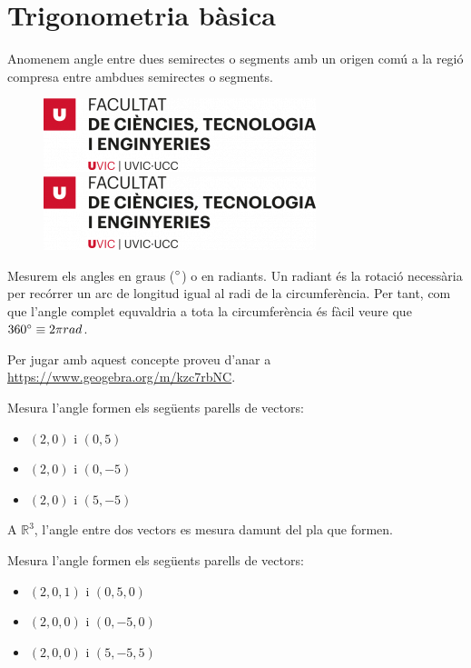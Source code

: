 \documentclass{beamer}
\begin{document}
\section{Trigonometria bàsica}
\begin{frame}
\begin{definicio}
  Anomenem angle entre dues semirectes o segments amb un origen comú a la regió compresa entre ambdues semirectes o segments.
\end{definicio}
  \begin{figure}
    \includegraphics[width=0.3\linewidth]{FCTE}
    \includegraphics[width=0.6\linewidth]{FCTE}
  \end{figure}
\end{frame}
\begin{frame}
  Mesurem els angles en graus ($\degree$) o en radiants. Un radiant és la rotació necessària per recórrer un arc de longitud igual al radi de la circumferència. Per tant, com que l'angle complet equvaldria a tota la circumferència és fàcil veure que $360\degree \equiv 2 \pi rad$.

  Per jugar amb aquest concepte proveu d'anar a \url{https://www.geogebra.org/m/kzc7rbNC}.
\end{frame}
\begin{frame}
  \begin{exercise}{}
    Mesura l'angle formen els següents parells de vectors:
    \begin{itemize}
      \item  $(2,0)$ i $(0,5)$
      \item $(2,0)$ i $(0,-5)$
      \item $(2,0)$ i $(5,-5)$
    \end{itemize}
  \end{exercise}

  A $\mathbb{R}^3$, l'angle entre dos vectors es mesura damunt del pla que formen.

  \begin{exercise}{}{}
    Mesura l'angle formen els següents parells de vectors:
    \begin{itemize}
      \item  $(2,0,1)$ i $(0,5,0)$
      \item $(2,0,0)$ i $(0,-5,0)$
      \item $(2,0,0)$ i $(5,-5,5)$
    \end{itemize}
  \end{exercise}

\end{frame}
\end{document}
